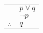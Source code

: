 \documentclass{standalone}
\begin{document}
\begin{tabular}{rl}
    & $p \lor q$ \\
    & $\lnot p$ \\
    \hline
    $\therefore$ & $q$
\end{tabular}
\end{document}
